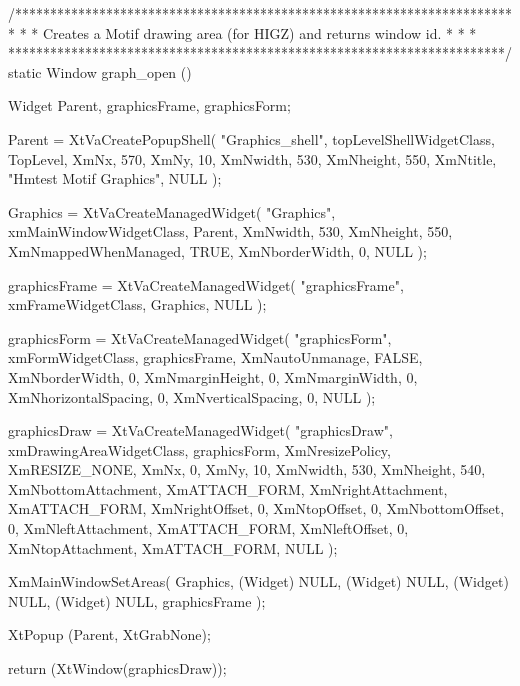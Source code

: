 /***********************************************************************
 *                                                                     *
 *   Creates a Motif drawing area (for HIGZ)  and returns window id.   *
 *                                                                     *
 ***********************************************************************/
static Window graph_open ()
{
   Widget        Parent, graphicsFrame, graphicsForm;

   Parent = XtVaCreatePopupShell( "Graphics_shell",
                        topLevelShellWidgetClass, TopLevel,
                        XmNx, 570,
                        XmNy, 10,
                        XmNwidth, 530,
                        XmNheight, 550,
                        XmNtitle, "Hmtest Motif Graphics",
                        NULL );

   Graphics = XtVaCreateManagedWidget( "Graphics",
                        xmMainWindowWidgetClass,
                        Parent,
                        XmNwidth, 530,
                        XmNheight, 550,
                        XmNmappedWhenManaged, TRUE,
                        XmNborderWidth, 0,
                        NULL );

   graphicsFrame = XtVaCreateManagedWidget( "graphicsFrame",
                        xmFrameWidgetClass,
                        Graphics,
                        NULL );

   graphicsForm = XtVaCreateManagedWidget( "graphicsForm",
                        xmFormWidgetClass,
                        graphicsFrame,
                        XmNautoUnmanage, FALSE,
                        XmNborderWidth, 0,
                        XmNmarginHeight, 0,
                        XmNmarginWidth, 0,
                        XmNhorizontalSpacing, 0,
                        XmNverticalSpacing, 0,
                        NULL );

   graphicsDraw = XtVaCreateManagedWidget( "graphicsDraw",
                        xmDrawingAreaWidgetClass,
                        graphicsForm,
                        XmNresizePolicy, XmRESIZE_NONE,
                        XmNx, 0,
                        XmNy, 10,
                        XmNwidth, 530,
                        XmNheight, 540,
                        XmNbottomAttachment, XmATTACH_FORM,
                        XmNrightAttachment, XmATTACH_FORM,
                        XmNrightOffset, 0,
                        XmNtopOffset, 0,
                        XmNbottomOffset, 0,
                        XmNleftAttachment, XmATTACH_FORM,
                        XmNleftOffset, 0,
                        XmNtopAttachment, XmATTACH_FORM,
                        NULL );

   XmMainWindowSetAreas( Graphics, (Widget) NULL, (Widget) NULL,
                        (Widget) NULL, (Widget) NULL, graphicsFrame );

   XtPopup (Parent, XtGrabNone);

   return (XtWindow(graphicsDraw));
}

